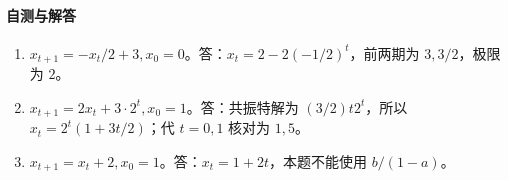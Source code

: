 \paragraph{自测与解答}
\begin{enumerate}
\item $x_{t+1}=-x_t/2+3,x_0=0$。答：$x_t=2-2(-1/2)^t$，前两期为 $3,3/2$，极限为 $2$。
\item $x_{t+1}=2x_t+3\cdot2^t,x_0=1$。答：共振特解为 $(3/2)t2^t$，所以 $x_t=2^t(1+3t/2)$；代 $t=0,1$ 核对为 $1,5$。
\item $x_{t+1}=x_t+2,x_0=1$。答：$x_t=1+2t$，本题不能使用 $b/(1-a)$。
\end{enumerate}
